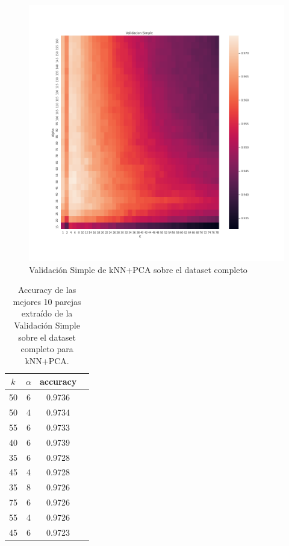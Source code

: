 \begin{figure}[H]
    \centering
    \includegraphics[width=12cm]{images/validacionSimple_datasetCompleto_knnpca_k80}%
    \qquad
    \caption{Validación Simple de kNN+PCA sobre el dataset completo}
    \label{knnpca_valSimpleCompleto}%
\end{figure}


\begin{table}[h!]
    \begin{center}
        \begin{tabular}{|c|c|c|c|}
        \hline
        \textbf{$k$} & \textbf{$\alpha$} & \textbf{accuracy} \\
        \hline
        50 & 6 & 0.9736\\
        50 & 4 & 0.9734\\
        55 & 6 & 0.9733\\
        40 & 6 & 0.9739\\
        35 & 6 & 0.9728\\
        45 & 4 & 0.9728\\
        35 & 8 & 0.9726\\
        75 & 6 & 0.9726\\
        55 & 4 & 0.9726\\
        45 & 6 & 0.9723\\
        
        \hline
        \end{tabular}
        \caption{Accuracy de las mejores 10 parejas extraído de la Validación Simple sobre el dataset completo para kNN+PCA.}
        \label{knnpca_valSimple_table}
    \end{center}
\end{table}

